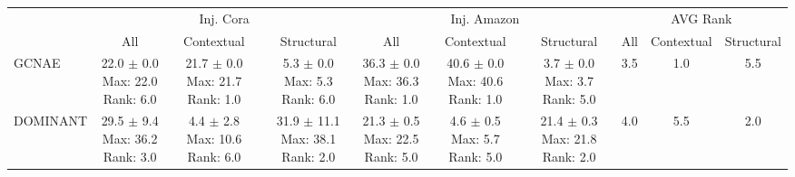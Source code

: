 \begin{longtable}{|l|c|c|c|c|c|c|c|c|c|}
\hline
 & \multicolumn{3}{|c|}{Inj. Cora} & \multicolumn{3}{|c|}{Inj. Amazon} & \multicolumn{3}{|c|}{AVG Rank} \\ \cline{2-10}
 & All & Contextual & Structural & All & Contextual & Structural & All & Contextual & Structural \\ \hline
GCNAE & \makecell{ 22.0 $\pm$ 0.0 \\ \scriptsize Max: 22.0 \\ \scriptsize Rank: 6.0 } & \makecell{ 21.7 $\pm$ 0.0 \\ \scriptsize Max: 21.7 \\ \scriptsize Rank: 1.0 } & \makecell{ 5.3 $\pm$ 0.0 \\ \scriptsize Max: 5.3 \\ \scriptsize Rank: 6.0 } & \makecell{ 36.3 $\pm$ 0.0 \\ \scriptsize Max: 36.3 \\ \scriptsize Rank: 1.0 } & \makecell{ 40.6 $\pm$ 0.0 \\ \scriptsize Max: 40.6 \\ \scriptsize Rank: 1.0 } & \makecell{ 3.7 $\pm$ 0.0 \\ \scriptsize Max: 3.7 \\ \scriptsize Rank: 5.0 } & 3.5 & 1.0 & 5.5 \\ \hline 
DOMINANT & \makecell{ 29.5 $\pm$ 9.4 \\ \scriptsize Max: 36.2 \\ \scriptsize Rank: 3.0 } & \makecell{ 4.4 $\pm$ 2.8 \\ \scriptsize Max: 10.6 \\ \scriptsize Rank: 6.0 } & \makecell{ 31.9 $\pm$ 11.1 \\ \scriptsize Max: 38.1 \\ \scriptsize Rank: 2.0 } & \makecell{ 21.3 $\pm$ 0.5 \\ \scriptsize Max: 22.5 \\ \scriptsize Rank: 5.0 } & \makecell{ 4.6 $\pm$ 0.5 \\ \scriptsize Max: 5.7 \\ \scriptsize Rank: 5.0 } & \makecell{ 21.4 $\pm$ 0.3 \\ \scriptsize Max: 21.8 \\ \scriptsize Rank: 2.0 } & 4.0 & 5.5 & 2.0 \\ \hline 

\end{longtable}
